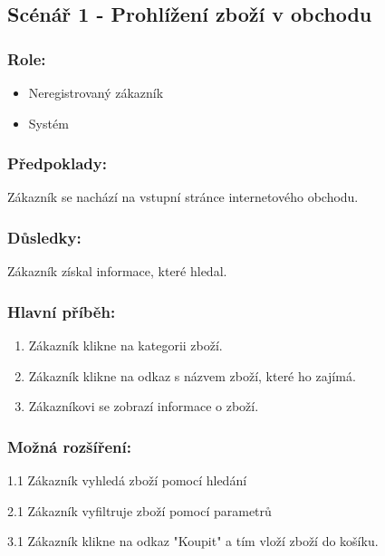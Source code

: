 \documentclass[11pt,twoside,a4paper]{book}
\begin{document}
\subsection{Scénář 1 - Prohlížení zboží v obchodu}
\subsubsection*{Role:}

\begin{itemize}
\item Neregistrovaný zákazník
\item Systém
\end{itemize}

\subsubsection*{Předpoklady:}

Zákazník se nachází na vstupní stránce internetového obchodu.

\subsubsection*{Důsledky:}

Zákazník získal informace, které hledal.

\subsubsection*{Hlavní příběh:}
\begin{enumerate}
\item Zákazník klikne na kategorii zboží.
\item Zákazník klikne na odkaz s názvem zboží, které ho zajímá.
\item Zákazníkovi se zobrazí informace o zboží.
\end{enumerate}

\subsubsection*{Možná rozšíření:}

\begin{description}
\item 1.1 Zákazník vyhledá zboží pomocí hledání
\item 2.1 Zákazník vyfiltruje zboží pomocí parametrů
\item 3.1 Zákazník klikne na odkaz "Koupit" a tím vloží zboží do košíku.
\end{description}
\end{document}
